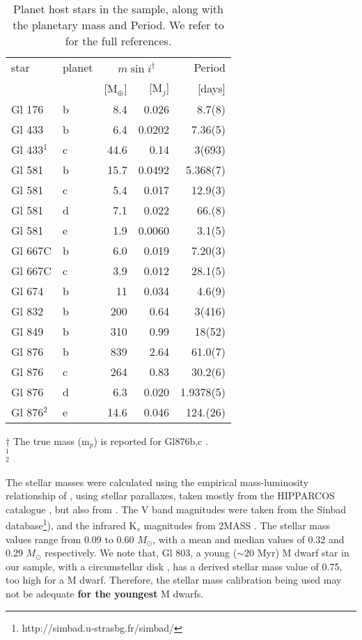 \documentclass[structabstract]{aa}
\begin{document}
\begin{table}[h]
\centering
\caption{Planet host stars in the sample, along with the planetary mass and Period. We refer to \citet{Bonfils-2011} for the full references.}
\label{planets}
\begin{center}
\begin{tabular}{l l r r r }

\hline
\hline
star & planet & \multicolumn{2}{c}{$m\sin{i}^{\dag}$} & Period \\
     &        &  [M$_{\oplus}$] & [M$_{j}$]     & [days] \\
\hline
Gl 176 & b &  8.4 & 0.026 &  8.7(8) \\
Gl 433 & b &  6.4 & 0.0202 &  7.36(5) \\
Gl 433$^{1}$ & c & 44.6 & 0.14 & 3(693) \\
Gl 581 & b & 15.7 & 0.0492 &  5.368(7)\\
Gl 581 & c &  5.4 & 0.017 & 12.9(3) \\
Gl 581 & d &  7.1 & 0.022 & 66.(8) \\
Gl 581 & e &  1.9 & 0.0060 &  3.1(5) \\
Gl 667C & b &  6.0 & 0.019 &  7.20(3) \\
Gl 667C & c &  3.9 & 0.012 & 28.1(5) \\
Gl 674 & b & 11 & 0.034 &  4.6(9) \\
Gl 832 & b & 200 & 0.64 & 3(416) \\
Gl 849 & b & 310 & 0.99 & 18(52) \\
Gl 876 & b & 839 & 2.64 & 61.0(7) \\
Gl 876 & c & 264 & 0.83 & 30.2(6) \\
Gl 876 & d &  6.3 & 0.020 &  1.9378(5) \\
Gl 876$^{2}$ & e & 14.6 & 0.046 & 124.(26) \\
\hline
\hline
\end{tabular}
\end{center}
\raggedright
$\dag$ The true mass (m$_{p}$) is reported for Gl876b,c \citep{Correia-2010}. \\
$^{1}$ \citet{Delfosse-2012}\\
$^{2}$ \citet{Rivera-2010} 
\end{table}




The stellar masses were calculated using the empirical mass-luminosity relationship of \citet{Delfosse-2000}, using stellar parallaxes, taken mostly from the HIPPARCOS catalogue \citep{van_Leeuwen-2007} , but also from \citet{van_Altena-1995, Jahreiss-1997, Hawley-1997, Henry-2006}. The V band magnitudes were taken from the Sinbad database\footnote{http://simbad.u-strasbg.fr/simbad/}), and the infrared K$_{s}$ magnitudes from 2MASS \citep{Skrutskie-2006}. The stellar mass values range from 0.09 to 0.60 $M_{\odot}$, with a mean and median values of 0.32 and 0.29 $M_{\odot}$ respectively. We note that, Gl 803, a young ($\sim 20$ Myr) M dwarf star in our sample, with a circumstellar disk \citep{Kalas-2004}, has a derived stellar mass value of 0.75, too high for a M dwarf. Therefore, the stellar mass calibration being used may not be adequate \textbf{for the youngest} M dwarfs. 
\end{document}
